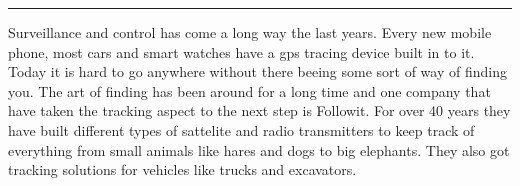 
\vspace{-10ex}%
\rule{\textwidth}{0.3pt}
\vspace{5ex}


Surveillance and control has come a long way the last years. Every new mobile phone, most cars and smart watches have a \gls{gps} tracing device built in to it. Today it is hard to go anywhere without there beeing some sort of way of finding you. The art of finding has been around for a long time and one company that have taken the tracking aspect to the next step is Followit. For over 40 years they have built different types of sattelite and radio transmitters to keep track of everything from small animals like hares and dogs to big elephants. They also got tracking solutions for vehicles like trucks and excavators. 


\thispagestyle{empty}